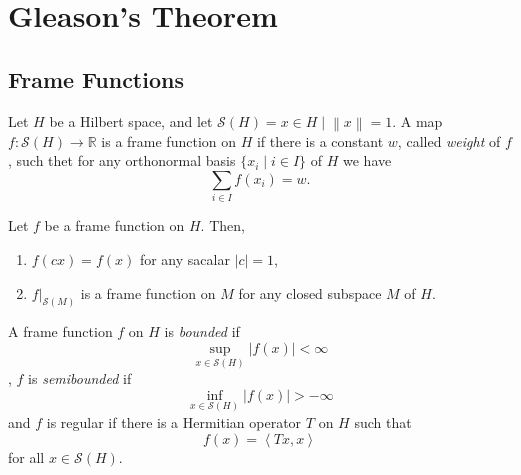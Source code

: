 \chapter{Gleason's Theorem}

\section{Frame Functions}

\begin{definition}
    Let \(H\) be a Hilbert space, and let \(\mathcal{S}(H)={x \in H \mid \left \lVert x \right \rVert=1}\). A map \(f:\mathcal{S}(H) \to \mathbb{R}\) is a frame function on \(H\) if there is a constant \(w\), called \emph{weight} of \(f\), such thet for any orthonormal basis \(\{x_i \mid i \in I\}\) of \(H\) we have
    \[\sum_{i \in I} f(x_i)=w.\]
\end{definition}

\begin{remark} Let \(f\) be a frame function on \(H\). Then,
    \begin{enumerate}
        \item \(f(c x) = f(x)\) for any sacalar \(\left \lvert c \right \rvert=1\),
        \item \(f\rvert_{\mathcal{S}(M)} \) is a frame function on \(M\) for any closed subspace \(M\) of \(H\).
    \end{enumerate}
\end{remark}

 A frame function \(f\) on \(H\) is \emph{bounded} if
 \[\sup_{x \in \mathcal{S}(H)} \left \lvert f(x) \right \rvert < \infty\]
 , \(f\) is \emph{semibounded} if
 \[\inf_{x \in \mathcal{S}(H)} \left \lvert f(x) \right \rvert > -\infty\]
 and \(f\) is regular if there is a Hermitian operator \(T\) on \(H\) such that
 \[f(x) = \left \langle Tx,x \right \rangle\]
 for all \(x \in \mathcal{S}(H)\).

